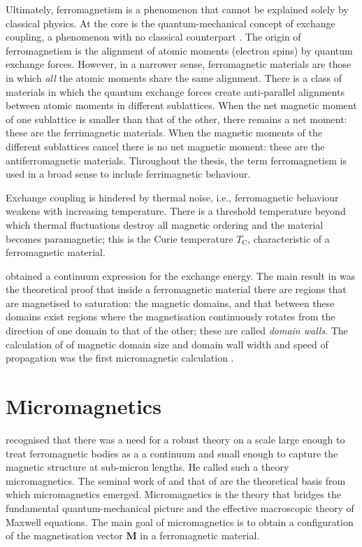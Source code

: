 Ultimately, ferromagnetism is a phenomenon that cannot be explained solely by classical physics. At the core is the quantum-mechanical concept of exchange coupling, a phenomenon with no classical counterpart \citep{Heisenberg1926}. The origin of ferromagnetism is the alignment of atomic moments (electron spins) by quantum exchange forces. However, in a narrower sense, ferromagnetic materials are those in which \emph{all} the atomic moments share the same alignment. There is a class of materials in which the quantum exchange forces create anti-parallel alignments between atomic moments in different sublattices. When the net magnetic moment of one sublattice is smaller than that of the other, there remains a net moment: these are the ferrimagnetic materials. When the magnetic moments of the different sublattices cancel there is no net magnetic moment: these are the antiferromagnetic materials. Throughout the thesis, the term ferromagnetism is used in a broad sense to include ferrimagnetic behaviour.\par

Exchange coupling is hindered by thermal noise, i.e., ferromagnetic behaviour weakens with increasing temperature. There is a threshold temperature beyond which thermal fluctuations destroy all magnetic ordering and the material becomes paramagnetic; this is the Curie temperature $T_\text{C}$, characteristic of a ferromagnetic material.\par

\citet{Landau1935} obtained a continuum expression for the exchange energy. The main result in \citet{Landau1935} was the theoretical proof that inside a ferromagnetic material there are regions that are magnetised to saturation: the magnetic domains, and that between these domains exist regions where the magnetisation continuously rotates from the direction of one domain to that of the other; these are called \textit{domain walls}. The calculation of \citet{Landau1935} of magnetic domain size and domain wall width and speed of propagation was the first micromagnetic calculation \citep{Brown}.

\section{Micromagnetics}
\citet{Brown} recognised that there was a need for a robust theory on a scale large enough to treat ferromagnetic bodies as a a continuum and small enough to capture the magnetic structure at sub-micron lengths. He called such a theory micromagnetics. The seminal work of \citet{Landau1935} and that of \citet{Brown} are the theoretical basis from which micromagnetics emerged. Micromagnetics is the theory that bridges the fundamental quantum-mechanical picture and the effective macroscopic theory of Maxwell equations. The main goal of micromagnetics is to obtain a configuration of the magnetisation vector $\boldsymbol{M}$ in a ferromagnetic material.\par

